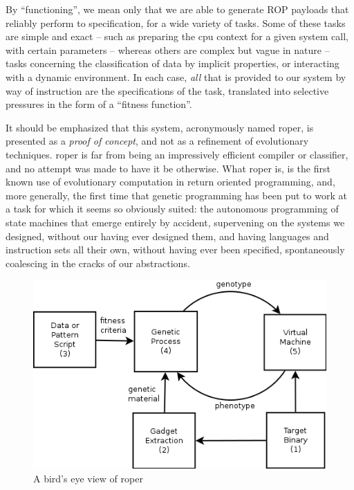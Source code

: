 \documentclass[12pt,glossary]{dalthesis}
\begin{document}
By ``functioning'', we mean only that we are able to generate
ROP payloads that reliably perform to specification, for a wide
variety of tasks. Some of these tasks are simple and exact
-- such as preparing the \gls{cpu} context for a given system call,
with certain parameters -- whereas others are complex but
vague in nature -- tasks concerning the classification of data
by implicit properties, or interacting with a dynamic environment.
In each case, \emph{all} that is provided to our system by way of
instruction are the specifications of the task, translated into
selective pressures in the form of a ``fitness function''.

It should be emphasized that this system, acronymously named \gls{roper}, is
presented as a \emph{proof of concept}, and not as a refinement of evolutionary
techniques. \gls{roper} is far from being an impressively efficient compiler or
classifier, and no attempt was made to have it be otherwise. What \gls{roper} is, is
the first known use of evolutionary computation in return oriented programming,
and, more generally, the first time that genetic programming has been put to
work at a task for which it seems so obviously suited: the autonomous
programming of state machines that emerge entirely by accident, supervening on
the systems we designed, without our having ever designed them, and having
languages and instruction sets all their own, without having ever been
specified, spontaneously coalescing in the cracks of our abstractions.

\begin{figure}[htbp]
\centering
\includegraphics[width=.9\linewidth]{../images/birdseye.png}
\caption{\label{fig:org711ec58}
A bird's eye view of \gls{roper}}
\end{figure}
\end{document}
